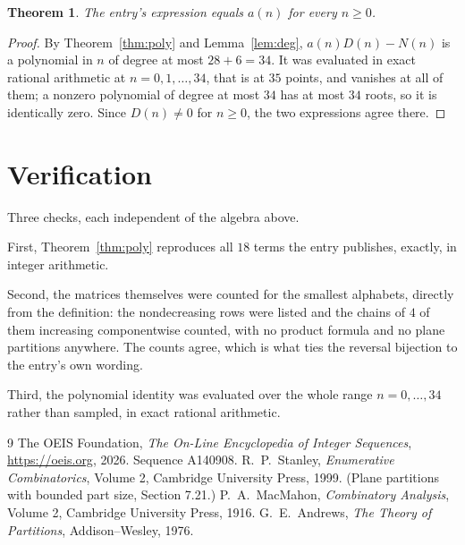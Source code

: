 \documentclass[11pt,a4paper]{article}
\theoremstyle{plain}
\newtheorem{theorem}{Theorem}
\theoremstyle{definition}
\begin{document}
\begin{theorem}
The entry's expression equals $a(n)$ for every $n\ge0$.
\end{theorem}

\begin{proof}
By Theorem~\ref{thm:poly} and Lemma~\ref{lem:deg}, $a(n)D(n)-N(n)$ is a polynomial in $n$
of degree at most $28+6=34$. It was evaluated in exact rational arithmetic at
$n=0,1,\dots,34$, that is at $35$ points, and vanishes at all of them; a nonzero polynomial
of degree at most $34$ has at most $34$ roots, so it is identically zero. Since $D(n)\neq0$
for $n\ge0$, the two expressions agree there.
\end{proof}

\section{Verification}

Three checks, each independent of the algebra above.

First, Theorem~\ref{thm:poly} reproduces all $18$ terms the entry publishes,
exactly, in integer arithmetic.

Second, the matrices themselves were counted for the smallest alphabets, directly from the
definition: the nondecreasing rows were listed and the chains of $4$ of them increasing
componentwise counted, with no product formula and no plane partitions anywhere. The counts
agree, which is what ties the reversal bijection to the entry's own wording.

Third, the polynomial identity was evaluated over the whole range $n=0,\dots,34$ rather than
sampled, in exact rational arithmetic.

\begin{thebibliography}{9}
 The OEIS Foundation, \emph{The On-Line Encyclopedia of Integer
Sequences}, \url{https://oeis.org}, 2026. Sequence A140908.
 R.~P.~Stanley, \emph{Enumerative Combinatorics}, Volume 2, Cambridge
University Press, 1999. (Plane partitions with bounded part size, Section 7.21.)
 P.~A.~MacMahon, \emph{Combinatory Analysis}, Volume 2, Cambridge
University Press, 1916.
 G.~E.~Andrews, \emph{The Theory of Partitions}, Addison--Wesley, 1976.
\end{thebibliography}
\end{document}

